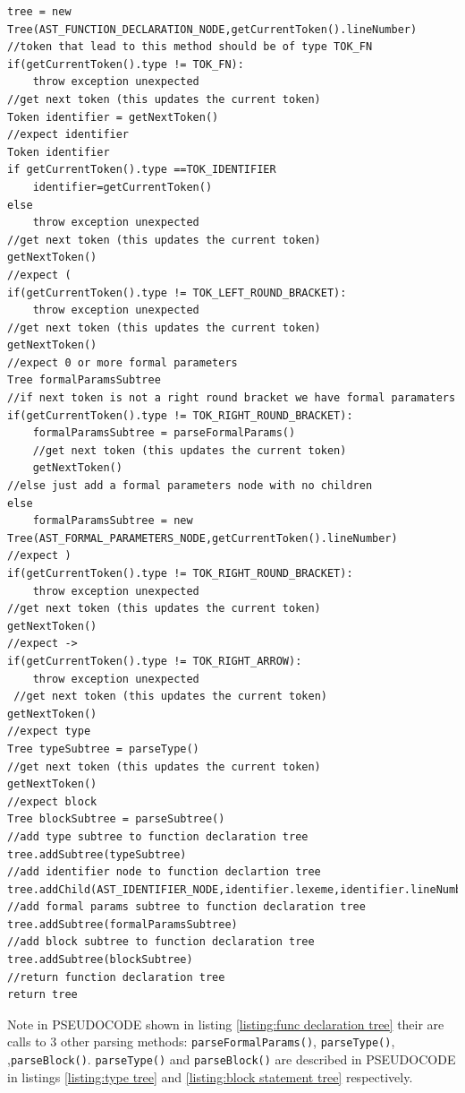 \begin{lstlisting}[caption=PSEUDOCODE for building a function declaration statement tree (\emph{parseFunctionDeclaration()}),label=listing:func declaration tree]
tree = new Tree(AST_FUNCTION_DECLARATION_NODE,getCurrentToken().lineNumber)
//token that lead to this method should be of type TOK_FN
if(getCurrentToken().type != TOK_FN):
    throw exception unexpected
//get next token (this updates the current token)
Token identifier = getNextToken()
//expect identifier 
Token identifier
if getCurrentToken().type ==TOK_IDENTIFIER
    identifier=getCurrentToken()
else 
    throw exception unexpected
//get next token (this updates the current token)
getNextToken()
//expect (
if(getCurrentToken().type != TOK_LEFT_ROUND_BRACKET):
    throw exception unexpected
//get next token (this updates the current token)
getNextToken()
//expect 0 or more formal parameters
Tree formalParamsSubtree
//if next token is not a right round bracket we have formal paramaters
if(getCurrentToken().type != TOK_RIGHT_ROUND_BRACKET):
    formalParamsSubtree = parseFormalParams()
    //get next token (this updates the current token)
    getNextToken()
//else just add a formal parameters node with no children
else
    formalParamsSubtree = new Tree(AST_FORMAL_PARAMETERS_NODE,getCurrentToken().lineNumber) 
//expect )
if(getCurrentToken().type != TOK_RIGHT_ROUND_BRACKET):
    throw exception unexpected
//get next token (this updates the current token)
getNextToken()
//expect ->
if(getCurrentToken().type != TOK_RIGHT_ARROW):
    throw exception unexpected
 //get next token (this updates the current token)
getNextToken()   
//expect type
Tree typeSubtree = parseType()
//get next token (this updates the current token)
getNextToken()
//expect block 
Tree blockSubtree = parseSubtree()
//add type subtree to function declaration tree
tree.addSubtree(typeSubtree)
//add identifier node to function declartion tree
tree.addChild(AST_IDENTIFIER_NODE,identifier.lexeme,identifier.lineNumber)
//add formal params subtree to function declaration tree
tree.addSubtree(formalParamsSubtree)
//add block subtree to function declaration tree
tree.addSubtree(blockSubtree)
//return function declaration tree
return tree
\end{lstlisting}
Note in PSEUDOCODE shown in listing  \ref{listing:func declaration tree}  their are calls to 3 other parsing methods:
\verb!parseFormalParams()!, \verb!parseType()!, ,\verb!parseBlock()!.  \verb!parseType()! and  \verb!parseBlock()! are described in PSEUDOCODE in listings \ref{listing:type tree} and \ref{listing:block statement tree} respectively.

